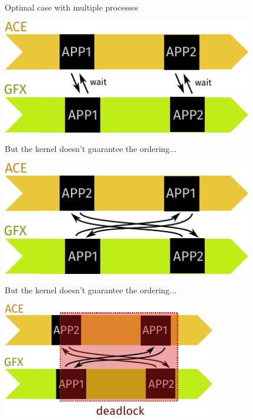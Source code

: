 \documentclass[aspectratio=169,t,xcolor=table]{beamer}
\begin{document}
\begin{frame}{Optimal case with multiple processes}

    \LARGE

    \begin{center}
        \includegraphics[height=5cm]{figs/task_deadlock_1.svg.pdf}
    \end{center}

\end{frame}

\begin{frame}{But the kernel doesn't guarantee the ordering...}

    \LARGE

    \begin{center}
        \includegraphics[height=5cm]{figs/task_deadlock_2.svg.pdf}
    \end{center}

\end{frame}

\begin{frame}{But the kernel doesn't guarantee the ordering...}

    \LARGE

    \begin{center}
        \includegraphics[height=5cm]{figs/task_deadlock_3.svg.pdf}
    \end{center}

\end{frame}
\end{document}
